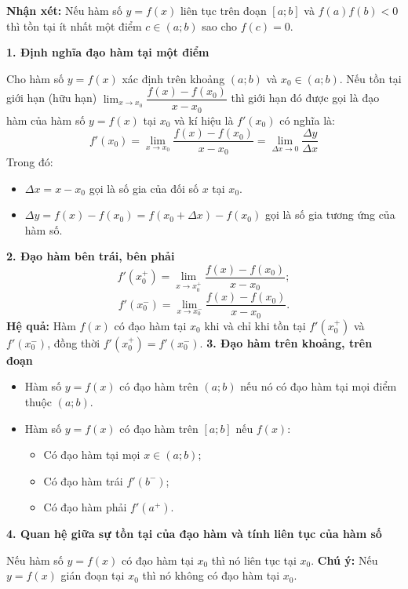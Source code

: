\documentclass[12pt,a4paper]{extarticle}
\begin{document}
\noindent\textbf{Nhận xét:} Nếu hàm số $y = f(x)$ liên tục trên đoạn $[a; b]$ và $f(a)f(b) < 0$ thì tồn tại ít nhất một điểm $c \in (a; b)$ sao cho $f(c) = 0$.
\vspace{0.4cm}

\noindent\textbf{1. Định nghĩa đạo hàm tại một điểm}

\noindent Cho hàm số $y = f(x)$ xác định trên khoảng $(a; b)$ và $x_0 \in (a; b)$.
\noindent Nếu tồn tại giới hạn (hữu hạn) $\lim_{x \to x_0} \dfrac{f(x) - f(x_0)}{x - x_0}$ thì giới hạn đó được gọi là đạo hàm của hàm số $y = f(x)$ tại $x_0$ và kí hiệu là $f'(x_0)$ có nghĩa là:
\[ f'(x_0) = \lim_{x \to x_0} \dfrac{f(x) - f(x_0)}{x - x_0} = \lim_{\Delta x \to 0} \dfrac{\Delta y}{\Delta x} \]
\noindent Trong đó:
\begin{itemize}
    \item[] $\Delta x = x - x_0$ gọi là số gia của đối số $x$ tại $x_0$.
    \item[] $\Delta y = f(x) - f(x_0) = f(x_0 + \Delta x) - f(x_0)$ gọi là số gia tương ứng của hàm số.
\end{itemize}
\vspace{0.4cm}
\noindent\textbf{2. Đạo hàm bên trái, bên phải}
\[ f'(x_0^+) = \lim_{x \to x_0^+} \dfrac{f(x) - f(x_0)}{x - x_0}; \]
\[ f'(x_0^-) = \lim_{x \to x_0^-} \dfrac{f(x) - f(x_0)}{x - x_0}. \]
\noindent\textbf{Hệ quả:} Hàm $f(x)$ có đạo hàm tại $x_0$ khi và chỉ khi tồn tại $f'(x_0^+)$ và $f'(x_0^-)$, đồng thời $f'(x_0^+) = f'(x_0^-)$.
\vspace{0.4cm}
\noindent\textbf{3. Đạo hàm trên khoảng, trên đoạn}
\begin{itemize}
    \item[-] Hàm số $y = f(x)$ có đạo hàm trên $(a; b)$ nếu nó có đạo hàm tại mọi điểm thuộc $(a; b)$.
    \item[-] Hàm số $y = f(x)$ có đạo hàm trên $[a; b]$ nếu $f(x)$:
    \begin{itemize}
        \item[+] Có đạo hàm tại mọi $x \in (a; b)$;
        \item[+] Có đạo hàm trái $f'(b^-)$;
        \item[+] Có đạo hàm phải $f'(a^+)$.
    \end{itemize}
\end{itemize}
\vspace{0.4cm}
\noindent\textbf{4. Quan hệ giữa sự tồn tại của đạo hàm và tính liên tục của hàm số}

\noindent Nếu hàm số $y = f(x)$ có đạo hàm tại $x_0$ thì nó liên tục tại $x_0$.
\noindent\textbf{Chú ý:} Nếu $y = f(x)$ gián đoạn tại $x_0$ thì nó không có đạo hàm tại $x_0$.
\vspace{0.4cm}
\end{document}
